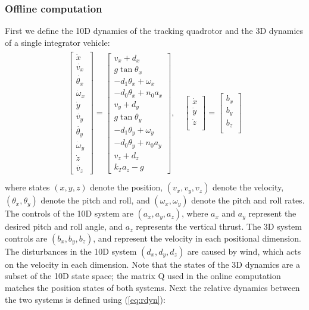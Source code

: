 \subsubsection{Offline computation}
First we define the 10D dynamics of the tracking quadrotor and the 3D dynamics of a single integrator vehicle:
\begin{equation}
\label{eq:Quad10D_dyn}
\begin{aligned}
\begin{array}{c}
\left[
\begin{array}{c}
\dot{x}\\
\dot{v_x}\\
\dot{\theta_x}\\
\dot\omega_x\\
\dot{y}\\
\dot{v_y}\\
\dot{\theta_y}\\
\dot\omega_y\\
\dot{z}\\
\dot{v_z}
\end{array}
\right]
=
\left[
\begin{array}{c}
v_x + d_x\\
g \tan \theta_x\\
-d_1 \theta_x + \omega_x\\
-d_0 \theta_x + n_0 a_x\\
v_y + d_y\\
g \tan \theta_y\\
-d_1 \theta_y + \omega_y\\
-d_0 \theta_y + n_0 a_y\\
v_z + d_z\\
k_T a_z - g
\end{array}
\right], \quad
\left[
\begin{array}{c}
\dot{x}\\
\dot{y}\\
\dot{z}\\
\end{array}
\right] 
=
\left[
\begin{array}{c}
b_x\\
b_y\\
b_z \\
\end{array}
\right]
\end{array}\\
\end{aligned}
\end{equation}
where states $(x, y, z)$ denote the position, $(v_x, v_y, v_z)$ denote the velocity, $(\theta_x, \theta_y)$ denote the pitch and roll, and $(\omega_x, \omega_y)$ denote the pitch and roll rates. The controls of the 10D system are $(a_x, a_y, a_z)$, where $a_x$ and $a_y$ represent the desired pitch and roll angle, and $a_z$ represents the vertical thrust. The 3D system controls are $(b_x, b_y, b_z)$, and represent the velocity in each positional dimension. The disturbances in the 10D system $(d_x, d_y, d_z)$ are caused by wind, which acts on the velocity in each dimension. Note that the states of the 3D dynamics are a subset of the 10D state space; the matrix Q used in the online computation matches the position states of both systems. Next the relative dynamics between the two systems is defined using (\ref{eq:rdyn}):

